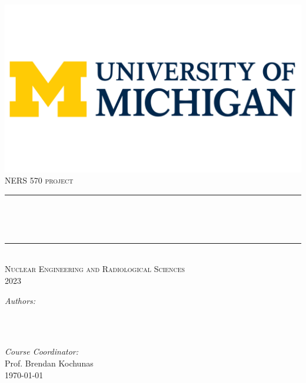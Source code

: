 \begin{titlepage}


\newcommand{\HRule}{\rule{\linewidth}{0.5mm}} %


\center
\includegraphics[width=10
cm]{Graphics/logoUM.png}\\[0.1cm]


\textsc{\large NERS 570 project}\\[1cm]

\makeatletter
\rule{\linewidth}{0.2 mm} \\[0.4 cm]
{\huge\bfseries \@title \par} \
\rule{\linewidth}{0.2 mm} \\[1.0 cm]
 \textsc{Nuclear Engineering and Radiological Sciences\\2023}\\[1.5cm] %

\begin{minipage}{0.2\textwidth}
\emph{Authors:}\\
\@author 
\end{minipage}
~
\begin{minipage}{0.4\textwidth}


\end{minipage}\\
\vspace{1cm}
\emph{Course Coordinator:}\\
Prof. Brendan Kochunas\\
\vspace{1cm}
\makeatother
{\large \today}\\[2cm] %
\vfill %





\end{titlepage}


